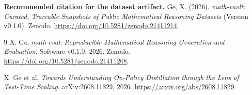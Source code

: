 \documentclass[10pt,a4paper]{article}
\begin{document}
\noindent\textbf{Recommended citation for the dataset artifact.} Ge, X. (2026). \emph{math-vault: Curated, Traceable Snapshots of Public Mathematical Reasoning Datasets} (Version v0.1.0). Zenodo. \url{https://doi.org/10.5281/zenodo.21411214}.

\begin{thebibliography}{9}
X. Ge. \emph{math-eval: Reproducible Mathematical Reasoning Generation and Evaluation}. Software v0.1.0, 2026. Zenodo. \url{https://doi.org/10.5281/zenodo.21411208}.

X. Ge et al. \emph{Towards Understanding On-Policy Distillation through the Lens of Test-Time Scaling}. arXiv:2608.11829, 2026. \url{https://arxiv.org/abs/2608.11829}.
\end{thebibliography}
\end{document}
